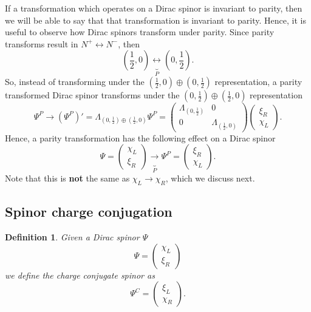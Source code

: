 \documentclass[11pt]{article}
\numberwithin{equation}{section}
\newtheorem{defn}{Definition}[section]
\begin{document}
If a transformation which operates on a Dirac spinor is invariant to parity, then we will be able to say that that transformation is invariant to parity. Hence, it is useful to observe how Dirac spinors transform under parity. Since parity transforms result in $N^+ \leftrightarrow N^-$, then
\begin{equation}
\left(\frac{1}{2}, 0\right) \underbrace{\leftrightarrow}_{P} \left(0, \frac{1}{2}\right).
\end{equation}
So, instead of transforming under the $(\frac{1}{2},0) \oplus (0, \frac{1}{2})$ representation, a parity transformed Dirac spinor transforms under the $(0, \frac{1}{2}) \oplus (\frac{1}{2},0)$ representation
\begin{equation}
\Psi^P \rightarrow (\Psi^P)' = \Lambda_{(0, \frac{1}{2}) \oplus (\frac{1}{2},0)} \Psi^P = \begin{pmatrix}
\Lambda_{(0, \frac{1}{2})} & 0 \\
0 & \Lambda_{(\frac{1}{2},0)} 
\end{pmatrix} \begin{pmatrix}
\xi_R \\
\chi_L
\end{pmatrix}.
\end{equation}
Hence, a parity transformation has the following effect on a Dirac spinor
\begin{equation}
\Psi = \begin{pmatrix}
\chi_L \\
\xi_R
\end{pmatrix} \underbrace{\rightarrow}_P
\Psi^P = \begin{pmatrix}
\xi_R \\
\chi_L
\end{pmatrix}.
\end{equation}
Note that this is \textbf{not} the same as $\chi_L \rightarrow \chi_R$, which we discuss next. 

\subsection{Spinor charge conjugation}
\begin{defn}
Given a Dirac spinor $\Psi$
\begin{equation}
\Psi = \begin{pmatrix}
\chi_L \\
\xi_R
\end{pmatrix}
\end{equation}
we define the charge conjugate spinor as 
\begin{equation}
\Psi^C = \begin{pmatrix}
\xi_L \\
\chi_R
\end{pmatrix}.
\end{equation}
\end{defn}
\end{document}
